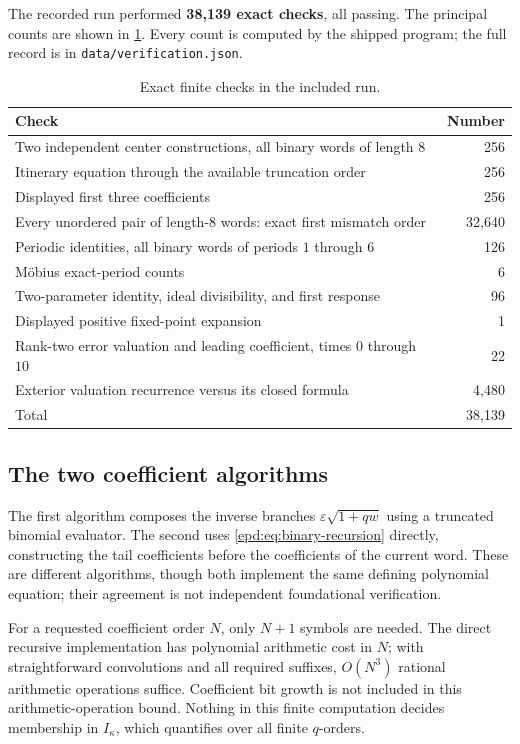\documentclass[11pt,a4paper]{article}
\numberwithin{equation}{section}
\theoremstyle{plain}
\theoremstyle{definition}
\theoremstyle{remark}
\begin{document}
The recorded run performed \textbf{38,139 exact checks}, all passing.
The principal counts are shown in \cref{epd:tab:checks}. Every count is
computed by the shipped program; the full record is in
\texttt{data/verification.json}.

\begin{table}[ht]
\centering\small
\caption{Exact finite checks in the included run.}\label{epd:tab:checks}
\begin{tabularx}{\linewidth}{@{}Xr@{}}
\toprule
Check & Number\\\midrule
Two independent center constructions, all binary words of length $8$ & 256\\
Itinerary equation through the available truncation order & 256\\
Displayed first three coefficients & 256\\
Every unordered pair of length-$8$ words: exact first mismatch order & 32,640\\
Periodic identities, all binary words of periods $1$ through $6$ & 126\\
M\"obius exact-period counts & 6\\
Two-parameter identity, ideal divisibility, and first response & 96\\
Displayed positive fixed-point expansion & 1\\
Rank-two error valuation and leading coefficient, times $0$ through $10$ & 22\\
Exterior valuation recurrence versus its closed formula & 4,480\\\midrule
Total & 38,139\\\bottomrule
\end{tabularx}
\end{table}

\subsection{The two coefficient algorithms}
The first algorithm composes the inverse branches
$\varepsilon\sqrt{1+qw}$ using a truncated binomial evaluator. The
second uses \eqref{epd:eq:binary-recursion} directly, constructing the tail
coefficients before the coefficients of the current word. These are
different algorithms, though both implement the same defining
polynomial equation; their agreement is not independent foundational
verification.

For a requested coefficient order $N$, only $N+1$ symbols are needed.
The direct recursive implementation has polynomial arithmetic cost
in $N$; with straightforward convolutions and all required suffixes,
$O(N^3)$ rational arithmetic operations suffice. Coefficient bit growth
is not included in this arithmetic-operation bound. Nothing in this
finite computation decides membership in $I_\kappa$, which quantifies
over all finite $q$-orders.
\end{document}
